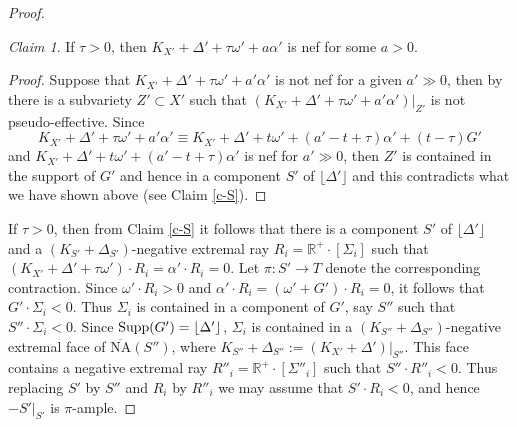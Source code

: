 \documentclass[12pt]{amsart}
\theoremstyle{plain}
\theoremstyle{remark}
\theoremstyle{definition}
\def\NA{\overline{\operatorname{NA}}}
\newcommand{\<}{\leq}
\newcommand{\mbR}{\mathbb{R}}
\newcommand{\Supp}{{\rm Supp}}
\def\lrd{\lfloor}
\def\rrd{\rfloor}
\def\lrd{\lfloor}
\def\rrd{\rfloor}
\def\NA{\operatorname{\overline{NA}}}
\theoremstyle{definition}
\theoremstyle{definition}
\numberwithin{equation}{section}
\theoremstyle{remark}
\newtheorem{claim}[theorem]{Claim}
\begin{document}
\begin{proof}
\begin{claim} If $\tau >0$, then $K_{X'}+\Delta '+\tau \omega'+a\alpha'$ is nef for some $a>0$.
\end{claim}
\begin{proof}
    Suppose that $K_{X'}+\Delta '+\tau \omega'+a'\alpha'$ is not nef for a given $a'\gg 0$, then by \cite[Theorem 2.36 and Remark 2.37]{DHP22} there is a subvariety $Z'\subset X'$ such that $(K_{X'}+\Delta '+\tau \omega'+a'\alpha ')|_{Z'}$ is not pseudo-effective. %
Since
\[K_{X'}+\Delta'+\tau \omega'+a'\alpha' \equiv  K_{X'}+\Delta'+t \omega'+(a'-t+\tau)\alpha'+(t-\tau)G' \]
and $K_{X'}+\Delta '+t \omega'+(a'-t+\tau)\alpha '$ is nef for $a'\gg 0$,
 then $Z'$ is contained in the support of $G'$ and hence in a component $S'$ of $\lfloor \Delta '\rfloor$ and this contradicts what we have shown above (see Claim \ref{c-S}).
\end{proof}


If $\tau >0$, then from Claim \ref{c-S} it follows that there is a component $S'$ of $\lfloor \Delta '\rfloor $ and a $(K_{S'}+\Delta _{S'})$-negative  extremal ray $R_i=\mbR^+\cdot[\Sigma_i]$ such that  $(K_{X'}+\Delta '+\tau \omega')\cdot R_i=\alpha'\cdot R_i=0$. Let $\pi : S'\to T$ denote the corresponding contraction. Since $\omega'\cdot R_i>0$ and  $\alpha '\cdot R_i=(\omega '+G ')\cdot R_i=0$, it follows that $G'\cdot \Sigma_i<0$. Thus $\Sigma_i$ is contained in a component of $G'$, say $S''$ such that $S''\cdot\Sigma_i<0$. Since $\Supp(G')=\lrd\Delta'\rrd$, $\Sigma_i$ is contained in a $(K_{S''}+\Delta_{S''})$-negative extremal face of $\NA(S'')$, where $K_{S''}+\Delta_{S''}:=(K_{X'}+\Delta')|_{S''}$. This face contains a negative extremal ray $R''_i=\mbR^+\cdot[\Sigma''_i]$ such that $S''\cdot R''_i<0$. Thus replacing $S'$ by $S''$ and $R_i$ by $R''_i$ we may assume that $S'\cdot R_i<0$, and hence $-S'|_{S'}$ is $\pi$-ample.


\end{proof}
\end{document}
